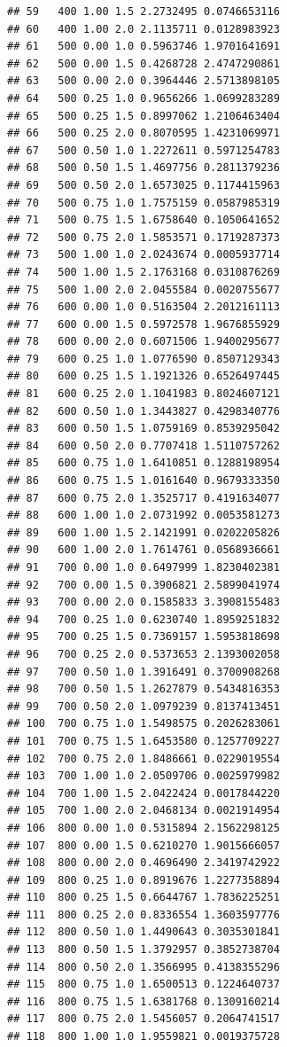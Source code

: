 \documentclass[11pt,a4paper]{article}
\begin{document}
\begin{verbatim}
## 59   400 1.00 1.5 2.2732495 0.0746653116
## 60   400 1.00 2.0 2.1135711 0.0128983923
## 61   500 0.00 1.0 0.5963746 1.9701641691
## 62   500 0.00 1.5 0.4268728 2.4747290861
## 63   500 0.00 2.0 0.3964446 2.5713898105
## 64   500 0.25 1.0 0.9656266 1.0699283289
## 65   500 0.25 1.5 0.8997062 1.2106463404
## 66   500 0.25 2.0 0.8070595 1.4231069971
## 67   500 0.50 1.0 1.2272611 0.5971254783
## 68   500 0.50 1.5 1.4697756 0.2811379236
## 69   500 0.50 2.0 1.6573025 0.1174415963
## 70   500 0.75 1.0 1.7575159 0.0587985319
## 71   500 0.75 1.5 1.6758640 0.1050641652
## 72   500 0.75 2.0 1.5853571 0.1719287373
## 73   500 1.00 1.0 2.0243674 0.0005937714
## 74   500 1.00 1.5 2.1763168 0.0310876269
## 75   500 1.00 2.0 2.0455584 0.0020755677
## 76   600 0.00 1.0 0.5163504 2.2012161113
## 77   600 0.00 1.5 0.5972578 1.9676855929
## 78   600 0.00 2.0 0.6071506 1.9400295677
## 79   600 0.25 1.0 1.0776590 0.8507129343
## 80   600 0.25 1.5 1.1921326 0.6526497445
## 81   600 0.25 2.0 1.1041983 0.8024607121
## 82   600 0.50 1.0 1.3443827 0.4298340776
## 83   600 0.50 1.5 1.0759169 0.8539295042
## 84   600 0.50 2.0 0.7707418 1.5110757262
## 85   600 0.75 1.0 1.6410851 0.1288198954
## 86   600 0.75 1.5 1.0161640 0.9679333350
## 87   600 0.75 2.0 1.3525717 0.4191634077
## 88   600 1.00 1.0 2.0731992 0.0053581273
## 89   600 1.00 1.5 2.1421991 0.0202205826
## 90   600 1.00 2.0 1.7614761 0.0568936661
## 91   700 0.00 1.0 0.6497999 1.8230402381
## 92   700 0.00 1.5 0.3906821 2.5899041974
## 93   700 0.00 2.0 0.1585833 3.3908155483
## 94   700 0.25 1.0 0.6230740 1.8959251832
## 95   700 0.25 1.5 0.7369157 1.5953818698
## 96   700 0.25 2.0 0.5373653 2.1393002058
## 97   700 0.50 1.0 1.3916491 0.3700908268
## 98   700 0.50 1.5 1.2627879 0.5434816353
## 99   700 0.50 2.0 1.0979239 0.8137413451
## 100  700 0.75 1.0 1.5498575 0.2026283061
## 101  700 0.75 1.5 1.6453580 0.1257709227
## 102  700 0.75 2.0 1.8486661 0.0229019554
## 103  700 1.00 1.0 2.0509706 0.0025979982
## 104  700 1.00 1.5 2.0422424 0.0017844220
## 105  700 1.00 2.0 2.0468134 0.0021914954
## 106  800 0.00 1.0 0.5315894 2.1562298125
## 107  800 0.00 1.5 0.6210270 1.9015666057
## 108  800 0.00 2.0 0.4696490 2.3419742922
## 109  800 0.25 1.0 0.8919676 1.2277358894
## 110  800 0.25 1.5 0.6644767 1.7836225251
## 111  800 0.25 2.0 0.8336554 1.3603597776
## 112  800 0.50 1.0 1.4490643 0.3035301841
## 113  800 0.50 1.5 1.3792957 0.3852738704
## 114  800 0.50 2.0 1.3566995 0.4138355296
## 115  800 0.75 1.0 1.6500513 0.1224640737
## 116  800 0.75 1.5 1.6381768 0.1309160214
## 117  800 0.75 2.0 1.5456057 0.2064741517
## 118  800 1.00 1.0 1.9559821 0.0019375728

\end{verbatim}
\end{document}
